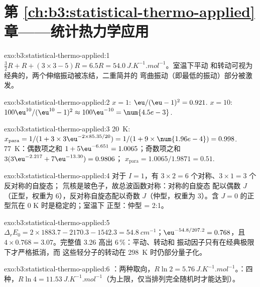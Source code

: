 \section*{第 \ref{ch:b3:statistical-thermo-applied} 章——统计热力学应用}

\begin{solution}{exo:b3:statistical-thermo-applied:1}
$\frac32R + R + (3 \times 3 - 5)R = 6.5R = \qty{54.0}{J.K^{-1}.mol^{-1}}$。室温下平动
和转动可视为经典的，两个伸缩振动被冻结，二重简并的
弯曲振动（即最低的振动）部分被激发。
\end{solution}

\begin{solution}{exo:b3:statistical-thermo-applied:2}
$x = 1$: $\eu/(\eu - 1)^2 = 0.921$. $x = 10$: $100\eu^{10}/(\eu^{10} - 1)^2 \approx 100\eu^{-10} = \num{4.5e-3}$.
\end{solution}

\begin{solution}{exo:b3:statistical-thermo-applied:3}
\qty{20}{K}: $x_{\mathrm{para}} = 1/(1 + 3 \times 3\eu^{-2 \times 85.35/20}) = 1/(1 + 9 \times \num{1.96e-4}) = 0.998$.
\qty{77}{K}：偶数项之和 $1 + 5\eu^{-6.651} = 1.0065$；奇数项之和 $3(3\eu^{-2.217} + 7\eu^{-13.30}) = 0.9806$；
$x_{\mathrm{para}} = 1.0065/1.9871 = 0.51$.
\end{solution}

\begin{solution}{exo:b3:statistical-thermo-applied:4}
对于 $I = 1$，有 $3 \times 2 = 6$ 个对称、$3 \times 1 = 3$ 个反对称的自旋态；
氘核是玻色子，故总波函数对称：对称的自旋态
配以偶数 $J$（正型，权重为 6），反对称自旋态配以奇数 $J$（仲型，权重为
3）。含 $J = 0$ 的正型氘在 0 K 时是稳定的；室温下
正型：仲型 = 2:1。
\end{solution}

\begin{solution}{exo:b3:statistical-thermo-applied:5}
$\Delta_rE_0 = 2 \times 1883.7 - 2170.3 - 1542.3 = \qty{54.8}{cm^{-1}}$；$\eu^{-54.8/207.2} = 0.768$，且
$4 \times 0.768 = 3.07$。完整值 3.26 高出 6\,\%：平动、转动和
振动因子只有在经典极限下才严格抵消，而
这些轻分子的转动在 \qty{298}{K} 时仍部分量子化。
\end{solution}

\begin{solution}{exo:b3:statistical-thermo-applied:6}
：两种取向，$R\ln2 = \qty{5.76}{J.K^{-1}.mol^{-1}}$。：四种，$R\ln4 =
\qty{11.53}{J.K^{-1}.mol^{-1}}$（为上限，仅当排列完全随机时才能达到）。
\end{solution}

